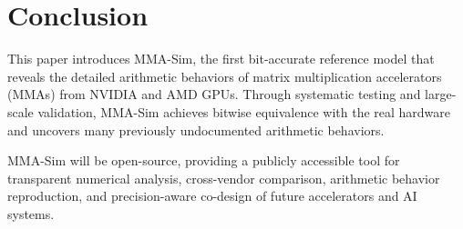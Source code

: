\section{Conclusion}

This paper introduces MMA-Sim, the first bit-accurate reference model that reveals the detailed arithmetic behaviors of matrix multiplication accelerators (MMAs) from NVIDIA and AMD GPUs. Through systematic testing and large-scale validation, MMA-Sim achieves bitwise equivalence with the real hardware and uncovers many previously undocumented arithmetic behaviors.

MMA-Sim will be open-source, providing a publicly accessible tool for transparent numerical analysis, cross-vendor comparison, arithmetic behavior reproduction, and precision-aware co-design of future accelerators and AI systems.
